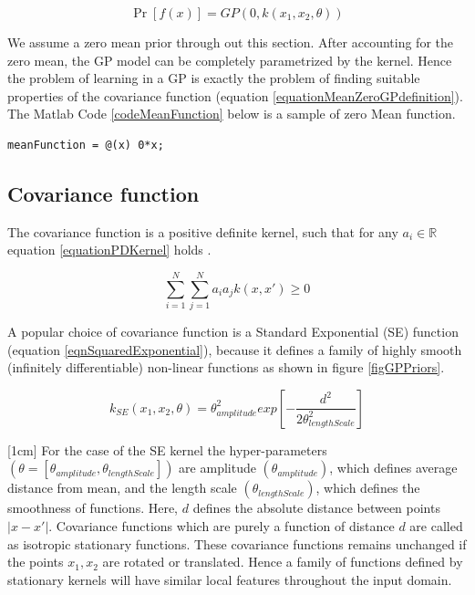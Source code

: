 \begin{equation}\label{equationMeanZeroGPdefinition}
\Pr[f(x)] = GP(0 , k(x_{1}, x_{2}, \theta))
\end{equation}

We assume a zero mean prior through out this section. After accounting for the zero mean, the GP model can be completely parametrized by the kernel. Hence the problem of learning in a GP is exactly the problem of finding suitable properties of the covariance function \cite{rasmussen2006gaussian} (equation \ref{equationMeanZeroGPdefinition}). The Matlab Code \ref{codeMeanFunction} below is a sample of zero Mean function. 

\begin{mdframed}[hidealllines=true,backgroundcolor=lightgray!20]
\begin{lstlisting}[caption={A zero mean function}, 
                    captionpos=b, 
                    label={codeMeanFunction},
                    style=Matlab-editor, 
                    backgroundcolor = \color{MatlabCellColour},
                   ]
% zero mean function
meanFunction = @(x) 0*x; 

\end{lstlisting}
\end{mdframed}

\subsection{Covariance function}\label{subSecCH2Covariance}
The covariance function is a positive definite kernel, such that for any $a_{i} \in \mathbb{R}$ equation \ref{equationPDKernel} holds \cite{Stein1999Springer}.

\begin{equation}\label{equationPDKernel}
\sum_{i=1}^{N}\sum_{j=1}^{N}a_{i}a_{j}k(x,x') \geq 0
\end{equation}

A popular choice of covariance function is a Standard Exponential (SE) function (equation \ref{eqnSquaredExponential}), because it defines a family of highly smooth (infinitely differentiable) non-linear functions as shown in figure \ref{figGPPriors}.

\begin{equation}\label{eqnSquaredExponential}
k_{SE}(x_{1}, x_{2}, \theta) = \theta_{amplitude}^2exp[-\frac{d^2}{2\theta_{lengthScale}^2}]
\end{equation}

[1cm]
For the case of the SE kernel the hyper-parameters $(\theta = [\theta_{amplitude}, \theta_{lengthScale}])$ are amplitude $(\theta_{amplitude})$, which defines average distance from mean, and the length scale $(\theta_{lengthScale})$, which defines the smoothness of functions. Here, $d$ defines the absolute distance between points $|x-x'|$. Covariance functions which are purely a function of distance $d$ are called as isotropic stationary functions. These covariance functions remains unchanged if the points $x_{1}, x_{2}$ are rotated or translated. Hence a family of functions defined by stationary kernels will have similar local features throughout the input domain. 

